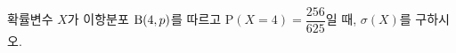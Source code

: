 확률변수 $X$가 이항분포 $\mathrm{B}(4{,}\mkern3mu\mathopen{}p)$를 따르고 $\mathrm{P}(X=4)=\dfrac{256}{625}$일 때, $\sigma(X)$를 구하시오.
